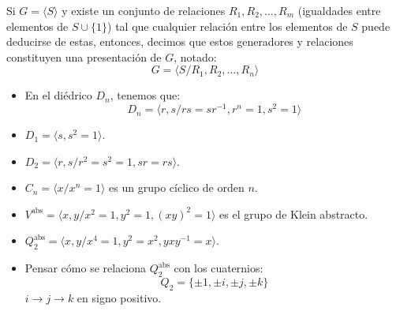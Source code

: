 \begin{prop}
    Si $G=\langle S \rangle $ y existe un conjunto de relaciones $R_1,R_2,\ldots,R_m$ (igualdades entre elementos de $S\cup\{1\}$) tal que cualquier relación entre los elementos de $S$ puede deducirse de estas, entonces, decimos que estos generadores y relaciones constituyen una presentación de $G$, notado:
    \begin{equation*}
        G=\langle S / R_1,R_2,\ldots, R_n \rangle 
    \end{equation*}
\end{prop}

\begin{ejemplo}
    \begin{itemize}
        Veamos que:
        \item En el diédrico $D_n$, tenemos que:
        \begin{equation*}
            D_n = \langle r,s / rs=sr^{-1}, r^n = 1, s^2 = 1 \rangle 
        \end{equation*}
        \item $D_1 = \langle s, s^2 = 1 \rangle$.
        \item $D_2 = \langle r,s/r^2 = s^2 = 1, sr=rs \rangle$.
        \item $C_n = \langle x / x^n = 1 \rangle $ es un grupo cíclico de orden $n$.
        \item $V^{\text{abs}} = \langle x,y / x^2=1,y^2 = 1, {(xy)}^{2}=1 \rangle $ es el grupo de Klein abstracto.
        \item $Q_2^{\text{abs}} = \langle x,y/x^4 = 1, y^2 = x^2, yxy^{-1} = x \rangle $.
        \item Pensar cómo se relaciona $Q_2^{\text{abs}}$ con los cuaternios:
            \begin{equation*}
                Q_2 = \{\pm 1, \pm i, \pm j, \pm k\}
            \end{equation*}
            $i\rightarrow j\rightarrow k$ en signo positivo.
    \end{itemize}
\end{ejemplo}

